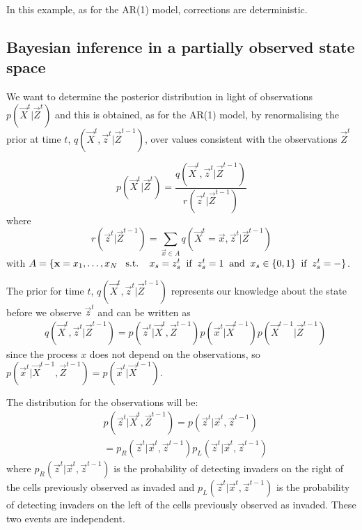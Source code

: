 In this example, as for the AR(1) model, corrections are deterministic.

\subsection{Bayesian inference in a partially observed state space}
\label{sec:8}

We want to determine the posterior distribution in light of observations $p(\vec{X}^{t} | \vec{Z}^{t})$ and this is obtained, as for the AR(1) model, by renormalising the prior at time $t$, $q(\vec{X}^{t}, \vec{z}^{t} | \vec{Z}^{t-1})$, over values consistent with the observations $\vec{Z}^{t}$

\begin{equation*}
    p(\vec{X}^{t} | \vec{Z}^{t})  =  \frac{q(\vec{X}^{t}, \vec{z}^{t} | \vec{Z}^{t-1})}{r(\vec{z}^{t} | \vec{Z}^{t-1})}
\end{equation*}
where {\color{blue}
\begin{equation*}
    r(\vec{z}^{t} | \vec{Z}^{t-1}) = \sum_{\vec{x}\in A} q(\vec{X}^{t} = \vec{x}, \vec{z}^{t} | \vec{Z}^{t-1})
\end{equation*}
with $A = \{ \vec{x} = x_1, \dots, x_N \; \text{\: s.t. \: } x_s = z_s^t \text{\: if \:} z_s^t = 1 \text{\: and \:} x_s \in \{ 0,1 \} \text{\: if \:} z_s^t = - \}$}.

The prior for time $t$, $q(\vec{X}^{t}, \vec{z}^t | \vec{Z}^{t-1})$ represents our knowledge about the state before we observe $\vec{z}^{t}$ and can be written as
\begin{align}
    & q(\vec{X}^{t}, \vec{z}^{t} | \vec{Z}^{t-1}) = p(\vec{z}^{t} | \vec{X}^{t}, \vec{Z}^{t-1}) p(\vec{x}^{t} | \vec{X}^{t-1}) p(\vec{X}^{t-1} | \vec{Z}^{t-1}) \label{eq:3}
\end{align}
since the process $x$ does not depend on the observations, so $p(\vec{x}^{t} | \vec{X}^{t-1}, \vec{Z}^{t-1}) = p(\vec{x}^{t} | \vec{X}^{t-1})$.

The distribution for the observations will be:
\begin{align*}
    & p(\vec{z}^{t} | \vec{X}^{t}, \vec{Z}^{t-1}) = p(\vec{z}^{t} | \vec{x}^{t}, \vec{z}^{t-1}) \\
    & = p_R(\vec{z}^{t} | \vec{x}^{t}, \vec{z}^{t-1}) p_L(\vec{z}^{t} | \vec{x}^{t}, \vec{z}^{t-1})
\end{align*}
where $p_R(\vec{z}^{t} | \vec{x}^{t}, \vec{z}^{t-1})$ is the probability of detecting invaders on the right of the cells previously observed as invaded and $p_L(\vec{z}^{t} | \vec{x}^{t}, \vec{z}^{t-1})$ is the probability of detecting invaders on the left of the cells previously observed as invaded. These two events are independent.

